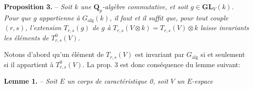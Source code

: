 \textbf{Proposition 3.} -- \textit{Soit $k$ une $\mathbf Q_p$-algèbre commutative, et soit $g\in\mathbf{GL}_V(k)$. Pour que $g$ appartienne à $G_{\mathrm{alg}}(k)$, il faut et il suffit que, pour tout couple $(r,s)$, l'extension $T_{r,s}(g)$ de $g$ à $T_{r,s}(V\otimes k)=T_{r,s}(V)\otimes k$ laisse invariants les éléments de $T^0_{r,s}(V)$.}

Notons d'abord qu'un élément de $T_{r,s}(V)$ est invariant par $G_{\mathrm{alg}}$ si et seulement si il appartient à $T^0_{r,s}(V)$. La prop. 3 est donc conséquence du lemme suivant:

\textbf{Lemme 1.} -- \textit{Soit $E$ un corps de caractéristique 0, soit $V$ un $E$-espace}
